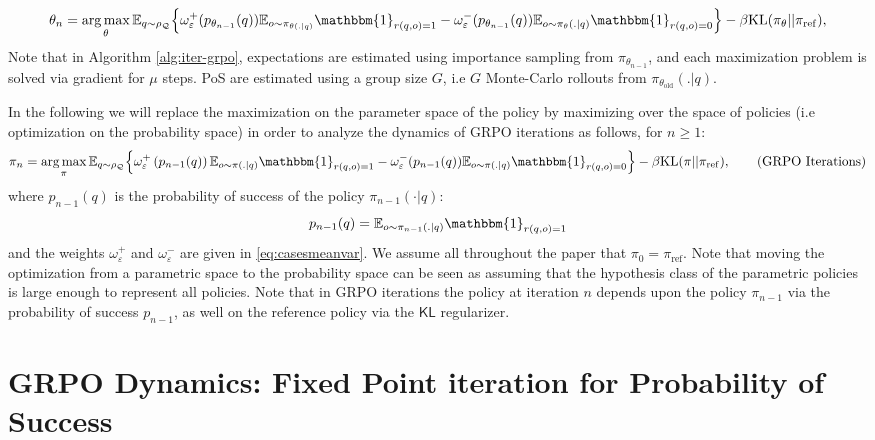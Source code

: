 \documentclass[11pt,reqno]{amsart}
\def\argmax{\operatornamewithlimits{arg\,max}}
\begin{document}
\begin{equation}
\theta_{n} = \argmax_{\theta}  \mathbb{E}_{q\sim \rho_{\mathcal{Q}}} \Big \{ \omega^+_{\varepsilon}(p_{\theta_{n-1}}(q))  \mathbb{E}_{o\sim \pi_{\theta(. |q) } }\mathbbm{1}_{r(q,o)=1}
- \omega^-_{\varepsilon}(p_{\theta_{n-1}}(q)) \mathbb{E}_{o\sim \pi_{\theta} (. |q) } \mathbbm{1}_{r(q,o)=0} \Big \}  - \beta \mathrm{KL} (\pi_{\theta} || \pi_{\mathrm{ref}}), 
\label{eq:grpoparametric}
\end{equation} 
Note that in Algorithm \ref{alg:iter-grpo}, expectations are estimated using importance sampling from $\pi_{\theta_{n-1}}$, and each maximization problem is solved via gradient for $\mu$ steps. PoS are estimated using a group size $G$, i.e $G$ Monte-Carlo rollouts from $\pi_{\theta_{\text{old}}}(.|q)$.

In the following we will replace the maximization on the parameter space of the policy by maximizing over the space of  policies (i.e optimization on the probability space) in order to analyze the dynamics of GRPO iterations as follows,  for $n\geq 1$:
\begin{equation}
\pi_{n} = \argmax_{\pi}  \mathbb{E}_{q\sim \rho_{\mathcal{Q}}} \Big \{ \omega^+_{\varepsilon}\left(p_{n-1}(q)\right)  \mathbb{E}_{o\sim \pi(. |q) } \mathbbm{1}_{r(q,o)=1}
- \omega^-_{\varepsilon}(p_{n-1}(q)) \mathbb{E}_{o\sim \pi (. |q) } \mathbbm{1}_{r(q,o)=0} \Big \}  - \beta \mathrm{KL} (\pi|| \pi_{\mathrm{ref}}), 
\label{eq:GRPO_iterations}
\tag{GRPO Iterations}
\end{equation}
where $p_{n-1}(q)$ is the probability of success of the policy $\pi_{n-1}(\cdot|q)$:
\begin{equation}
p_{n-1}(q)= \mathbb{E}_{o \sim \pi_{n-1} ( .| q )} \mathbbm{1}_{r(q,o)=1} 
\label{eq:psuccess}
\end{equation}
and the weights $\omega^+_\varepsilon$ and $\omega^-_{\varepsilon}$ are given in  \eqref{eq:casesmeanvar}. We assume  all throughout the paper that $\pi_0= \pi_{\mathrm{ref}}.$
Note that moving the optimization from a parametric space to the probability space can be seen as assuming that the hypothesis class of the parametric policies is large enough to represent all policies. 
Note that in  GRPO iterations the policy at iteration $n$ depends upon the policy $\pi_{n-1}$ via the probability of success $p_{n-1}$, as well on the reference policy via the $\mathsf{KL}$ regularizer. 

\section{GRPO Dynamics: Fixed Point iteration for Probability of Success  } \label{sec:Recursion}
\end{document}
